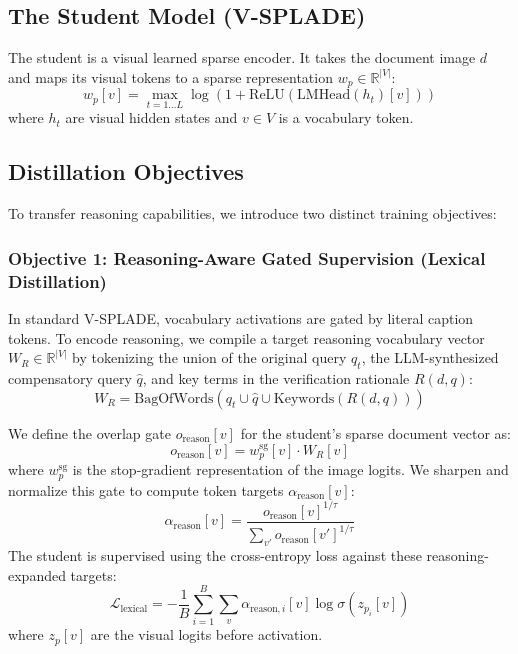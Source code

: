 \documentclass[11pt,a4paper]{article}
\begin{document}
\subsection{The Student Model (V-SPLADE)}
The student is a visual learned sparse encoder. It takes the document image $d$ and maps its visual tokens to a sparse representation $w_p \in \mathbb{R}^{|V|}$:
\begin{equation}
w_p[v] = \max_{t=1 \dots L} \log(1 + \text{ReLU}(\text{LMHead}(h_t)[v]))
\end{equation}
where $h_t$ are visual hidden states and $v \in V$ is a vocabulary token.

\subsection{Distillation Objectives}
To transfer reasoning capabilities, we introduce two distinct training objectives:

\subsubsection{Objective 1: Reasoning-Aware Gated Supervision (Lexical Distillation)}
In standard V-SPLADE, vocabulary activations are gated by literal caption tokens. To encode reasoning, we compile a target reasoning vocabulary vector $W_R \in \mathbb{R}^{|V|}$ by tokenizing the union of the original query $q_t$, the LLM-synthesized compensatory query $\hat{q}$, and key terms in the verification rationale $R(d, q)$:
\begin{equation}
W_R = \text{BagOfWords}(q_t \cup \hat{q} \cup \text{Keywords}(R(d, q)))
\end{equation}

We define the overlap gate $o_{\text{reason}}[v]$ for the student's sparse document vector as:
\begin{equation}
o_{\text{reason}}[v] = w_p^{\text{sg}}[v] \cdot W_R[v]
\end{equation}
where $w_p^{\text{sg}}$ is the stop-gradient representation of the image logits. We sharpen and normalize this gate to compute token targets $\alpha_{\text{reason}}[v]$:
\begin{equation}
\alpha_{\text{reason}}[v] = \frac{o_{\text{reason}}[v]^{1/\tau}}{\sum_{v'} o_{\text{reason}}[v']^{1/\tau}}
\end{equation}
The student is supervised using the cross-entropy loss against these reasoning-expanded targets:
\begin{equation}
\mathcal{L}_{\text{lexical}} = -\frac{1}{B} \sum_{i=1}^B \sum_v \alpha_{\text{reason}, i}[v] \log \sigma(z_{p_i}[v])
\end{equation}
where $z_p[v]$ are the visual logits before activation.
\end{document}
